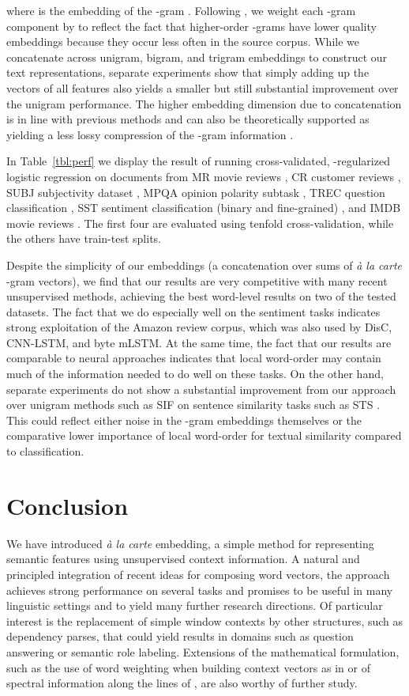 \documentclass[11pt,a4paper]{article}
\begin{document}
where  is the embedding of the -gram .
Following \citet{Arora:18a}, we weight each -gram component by  to reflect the fact that higher-order -grams have lower quality embeddings because they occur less often in the source corpus.
While we concatenate across unigram, bigram, and trigram embeddings to construct our text representations, separate experiments show that simply adding up the vectors of all features also yields a smaller but still substantial improvement over the unigram performance.
The higher embedding dimension due to concatenation is in line with previous methods and can also be theoretically supported as yielding a less lossy compression of the -gram information \cite{Arora:18a}.

In Table~\ref{tbl:perf} we display the result of running cross-validated, -regularized logistic regression on documents from MR movie reviews \citep{Pang:05}, CR customer reviews \citep{Hu:04}, SUBJ subjectivity dataset \citep{Pang:04}, MPQA opinion polarity subtask \citep{Wiebe:05}, TREC question classification \citep{Li:02}, SST sentiment classification (binary and fine-grained) \citep{Socher:13}, and IMDB movie reviews \citep{Maas:11}.
The first four are evaluated using tenfold cross-validation, while the others have train-test splits.

Despite the simplicity of our embeddings (a concatenation over sums of {\em\` a la carte} -gram vectors), we find that our results are very competitive with many recent unsupervised methods, achieving the best word-level results on two of the tested datasets.
The fact that we do especially well on the sentiment tasks indicates strong exploitation of the Amazon review corpus, which was also used by DisC, CNN-LSTM, and byte mLSTM.
At the same time, the fact that our results are comparable to neural approaches indicates that local word-order may contain much of the information needed to do well on these tasks.
On the other hand, separate experiments do not show a substantial improvement from our approach over unigram methods such as SIF \cite{Arora:17} on sentence similarity tasks such as STS \cite{Cer:17}.
This could reflect either noise in the -gram embeddings themselves or the comparative lower importance of local word-order for textual similarity compared to classification. 
\section{Conclusion}
We have introduced {\em\`a la carte} embedding, a simple method for representing semantic features using unsupervised context information.
A natural and principled integration of recent ideas for composing word vectors, the approach achieves strong performance on several tasks and promises to be useful in many linguistic settings and to yield many further research directions.
Of particular interest is the replacement of simple window contexts by other structures, such as dependency parses, that could yield results in domains such as question answering or semantic role labeling.
Extensions of the mathematical formulation, such as the use of word weighting when building context vectors as in \citet{Arora:18b} or of spectral information along the lines of \citet{Mu:18}, are also worthy of further study.
\end{document}
